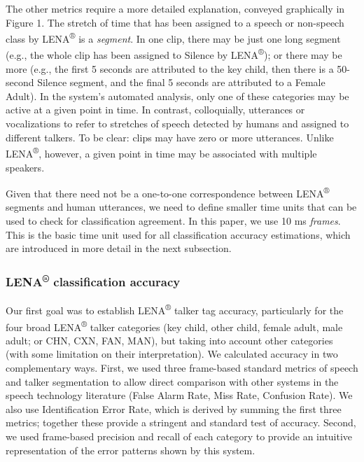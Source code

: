 \documentclass[english,table,man,floatsintext]{apa6}
\begin{document}
The other metrics require a more detailed explanation, conveyed
graphically in Figure 1. The stretch of time that has been assigned to a
speech or non-speech class by LENA\textsuperscript{®} is a
\emph{segment}. In one clip, there may be just one long segment (e.g.,
the whole clip has been assigned to Silence by LENA\textsuperscript{®});
or there may be more (e.g., the first 5 seconds are attributed to the
key child, then there is a 50-second Silence segment, and the final 5
seconds are attributed to a Female Adult). In the system's automated
analysis, only one of these categories may be active at a given point in
time. In contrast, colloquially, utterances or vocalizations to refer to
stretches of speech detected by humans and assigned to different
talkers. To be clear: clips may have zero or more utterances. Unlike
LENA\textsuperscript{®}, however, a given point in time may be
associated with multiple speakers.

Given that there need not be a one-to-one correspondence between
LENA\textsuperscript{®} segments and human utterances, we need to define
smaller time units that can be used to check for classification
agreement. In this paper, we use 10 ms \emph{frames}. This is the basic
time unit used for all classification accuracy estimations, which are
introduced in more detail in the next subsection.

\subsubsection{\texorpdfstring{LENA\textsuperscript{®} classification
accuracy}{LENA® classification accuracy}}\label{lena-classification-accuracy}

Our first goal was to establish LENA\textsuperscript{®} talker tag
accuracy, particularly for the four broad LENA\textsuperscript{®} talker
categories (key child, other child, female adult, male adult; or CHN,
CXN, FAN, MAN), but taking into account other categories (with some
limitation on their interpretation). We calculated accuracy in two
complementary ways. First, we used three frame-based standard metrics of
speech and talker segmentation to allow direct comparison with other
systems in the speech technology literature (False Alarm Rate, Miss
Rate, Confusion Rate). We also use Identification Error Rate, which is
derived by summing the first three metrics; together these provide a
stringent and standard test of accuracy. Second, we used frame-based
precision and recall of each category to provide an intuitive
representation of the error patterns shown by this system.
\end{document}

